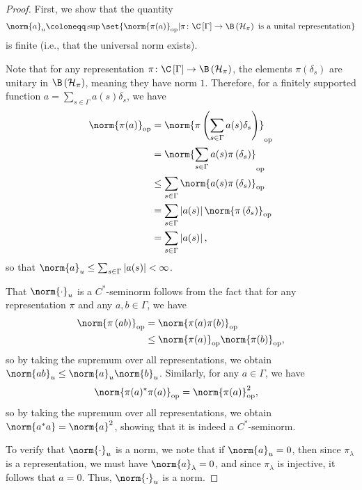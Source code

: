 \begin{proof}
  First, we show that the quantity
  \begin{align*}
    \norm{a}_{u}\coloneq \sup\set{\norm{\pi(a)}_{\op} | \pi\colon \C\left[ \Gamma \right]\rightarrow \B\left( \mathcal{H}_{\pi} \right)\text{ is a unital representation}}
  \end{align*}
  is finite (i.e., that the universal norm exists).\newline

  Note that for any representation $\pi\colon \C\left[ \Gamma \right]\rightarrow \B\left( \mathcal{H}_{\pi} \right)$, the elements $\pi\left( \delta_s \right)$ are unitary in $\B\left( \mathcal{H}_{\pi} \right)$, meaning they have norm $1$. Therefore, for a finitely supported function $a = \sum_{s\in\Gamma}a(s)\delta_s$, we have
  \begin{align*}
    \norm{\pi(a)}_{\op} &= \norm{\pi\left( \sum_{s\in\Gamma}a(s)\delta_s \right)}_{\op}\\
                        &= \norm{\sum_{s\in\Gamma}a(s)\pi\left( \delta_s \right)}_{\op}\\
                        &\leq \sum_{s\in\Gamma}\norm{a(s)\pi\left( \delta_s \right)}_{\op}\\
                        &= \sum_{s\in\Gamma}\left\vert a(s) \right\vert\norm{\pi\left( \delta_s \right)}_{\op}\\
                        &= \sum_{s\in\Gamma}\left\vert a(s) \right\vert,
  \end{align*}
  so that $\norm{a}_u\leq \sum_{s\in\Gamma}\left\vert a(s) \right\vert < \infty$.\newline

  That $\norm{\cdot}_{u}$ is a $C^{\ast}$-seminorm follows from the fact that for any representation $\pi$ and any $a,b\in \Gamma$, we have
  \begin{align*}
    \norm{\pi\left( ab \right)}_{\op} &= \norm{\pi(a)\pi(b)}_{\op}\\
                                      &\leq \norm{\pi(a)}_{\op}\norm{\pi(b)}_{\op},
  \end{align*}
  so by taking the supremum over all representations, we obtain $\norm{ab}_{u}\leq \norm{a}_{u}\norm{b}_{u}$. Similarly, for any $a\in\Gamma$, we have
  \begin{align*}
    \norm{\pi(a)^{\ast}\pi(a)}_{\op} &= \norm{\pi(a)}_{\op}^2,
  \end{align*}
  so by taking the supremum over all representations, we obtain $\norm{a^{\ast}a} = \norm{a}^2$, showing that it is indeed a $C^{\ast}$-seminorm.\newline

  To verify that $\norm{\cdot}_u$ is a norm, we note that if $\norm{a}_{u} = 0$, then since $\pi_{\lambda}$ is a representation, we must have $\norm{a}_{\lambda} = 0$, and since $\pi_{\lambda}$ is injective, it follows that $a = 0$. Thus, $\norm{\cdot}_u$ is a norm.
\end{proof}
